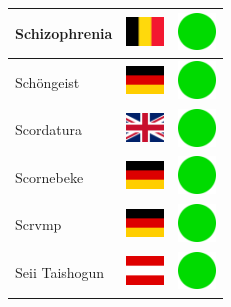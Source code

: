 \documentclass[12pt, a4paper, twoside]{report}
\begin{document}
\begin{center}
\begin{longtable}{|p{5cm}|p{2cm}|p{2cm}|}
Schizophrenia & \includegraphics[width=1cm]{4x3/be} & \includegraphics[width=1cm]{likes/y} \\ \hline
Schöngeist & \includegraphics[width=1cm]{4x3/de} & \includegraphics[width=1cm]{likes/y} \\ \hline
Scordatura & \includegraphics[width=1cm]{4x3/gb} & \includegraphics[width=1cm]{likes/y} \\ \hline
Scornebeke & \includegraphics[width=1cm]{4x3/de} & \includegraphics[width=1cm]{likes/y} \\ \hline
Scrvmp & \includegraphics[width=1cm]{4x3/de} & \includegraphics[width=1cm]{likes/y} \\ \hline
Seii Taishogun & \includegraphics[width=1cm]{4x3/at} & \includegraphics[width=1cm]{likes/y} \\ \hline

\end{longtable}
\end{center}
\end{document}
